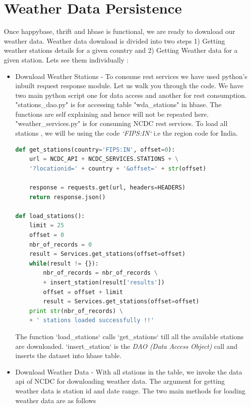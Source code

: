 \documentclass[9pt,twocolumn,twoside]{../../styles/osajnl}
\begin{document}
\section{Weather Data Persistence}
Once happybase, thrift and hbase is functional, we are ready to download our weather data. Weather data download is divided into two steps 1) Getting weather stations details for a given country and 2) Getting Weather data for a given station. Lets see them individually :
\begin{itemize}
\item Download Weather Stations - To consume rest services we have used python's inbuilt request response module.  Let us walk you through the code. We have two main python script one for data access and another for rest consumption. "stations\_dao.py" is for accessing table "wda\_stations" in hbase. The functions are self explaining and hence will not be repeated here. "weather\_services.py" is for consuming NCDC rest services. To load all stations , we will be using the code \textit{`FIPS:IN`} i.e the region code for India.\newline

\begin{lstlisting}[language=Python,caption=Get Weather Stations,breaklines=true]
def get_stations(country='FIPS:IN', offset=0):
    url = NCDC_API + NCDC_SERVICES.STATIONS + \
    '?locationid=' + country + '&offset=' + str(offset)
    
    response = requests.get(url, headers=HEADERS)
    return response.json()

def load_stations():
    limit = 25    
    offset = 0
    nbr_of_records = 0
    result = Services.get_stations(offset=offset)   
    while(result != {}):       
        nbr_of_records = nbr_of_records \
        + insert_station(result['results'])
        offset = offset + limit
        result = Services.get_stations(offset=offset)
    print str(nbr_of_records) \
    + ' stations loaded successfully !!'    
\end{lstlisting}
The function `load\_stations` calls `get\_stations` till all the available stations are downloaded. `insert\_station` is the \textit{DAO (Data Access Object)} call and inserts the dataset into hbase table.

\item Download Weather Data - With all stations in the table, we invoke the data api of NCDC for downloading weather data. The argument for getting weather data is station id and date range. The two main methods for loading weather data are as follows 


\end{itemize}
\end{document}
